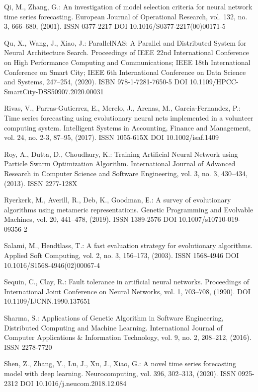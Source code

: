 \begin{thebibliography}{99.}
 Qi, M., Zhang, G.: An investigation of model selection criteria for neural network time series forecasting. European Journal of Operational Research, vol. 132, no. 3, 666--680, (2001). ISSN 0377-2217 DOI 10.1016/S0377-2217(00)00171-5

 Qu, X., Wang, J., Xiao, J.: ParallelNAS: A Parallel and Distributed System for Neural Architecture Search. Proceedings of IEEE 22nd International Conference on High Performance Computing and Communications; IEEE 18th International Conference on Smart City; IEEE 6th International Conference on Data Science and Systems, 247--254, (2020). ISBN 978-1-7281-7650-5 DOI 10.1109/HPCC-SmartCity-DSS50907.2020.00031

 Rivas, V., Parras-Gutierrez, E., Merelo, J., Arenas, M., Garcia-Fernandez, P.: Time series forecasting using evolutionary neural nets implemented in a volunteer computing system. Intelligent Systems in Accounting, Finance and Management, vol. 24, no. 2-3, 87--95, (2017). ISSN 1055-615X DOI 10.1002/isaf.1409

 Roy, A., Dutta, D., Choudhury, K.: Training Artificial Neural Network using Particle Swarm Optimization Algorithm. International Journal of Advanced Research in Computer Science and Software Engineering, vol. 3, no. 3, 430--434, (2013). ISSN 2277-128X

 Ryerkerk, M., Averill, R., Deb, K., Goodman, Е.: A survey of evolutionary algorithms using metameric representations. Genetic Programming and Evolvable Machines, vol. 20, 441--478, (2019). ISSN 1389-2576 DOI 10.1007/s10710-019-09356-2

 Salami, M., Hendtlass, T.: A fast evaluation strategy for evolutionary algorithms. Applied Soft Computing, vol. 2, no. 3, 156--173, (2003). ISSN 1568-4946 DOI 10.1016/S1568-4946(02)00067-4

 Sequin, C., Clay, R.: Fault tolerance in artificial neural networks. Proceedings of International Joint Conference on Neural Networks, vol. 1, 703--708, (1990). DOI 10.1109/IJCNN.1990.137651

 Sharma, S.: Applications of Genetic Algorithm in Software Engineering, Distributed Computing and Machine Learning. International Journal of Computer Applications \& Information Technology, vol. 9, no. 2, 208--212, (2016). ISSN 2278-7720

 Shen, Z., Zhang, Y., Lu, J., Xu, J., Xiao, G.: A novel time series forecasting model with deep learning. Neurocomputing, vol. 396, 302--313, (2020). ISSN 0925-2312 DOI 10.1016/j.neucom.2018.12.084


\end{thebibliography}
